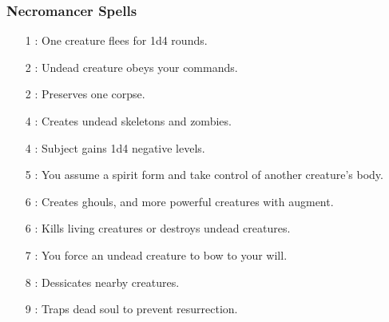 \subsubsection{Necromancer Spells}
\begin{itemize}
\item[1] : One creature flees for 1d4 rounds.
\item[2] : Undead creature obeys your commands.
\item[2] : Preserves one corpse.
\item[4] : Creates undead skeletons and zombies.
\item[4] : Subject gains 1d4 negative levels.
\item[5] : You assume a spirit form and take control of another creature's body.
\item[6] : Creates ghouls, and more powerful creatures with augment.
\item[6] : Kills living creatures or destroys undead creatures.
\item[7] : You force an undead creature to bow to your will.
\item[8] : Dessicates nearby creatures.
\item[9] : Traps dead soul to prevent resurrection.
\end{itemize}
